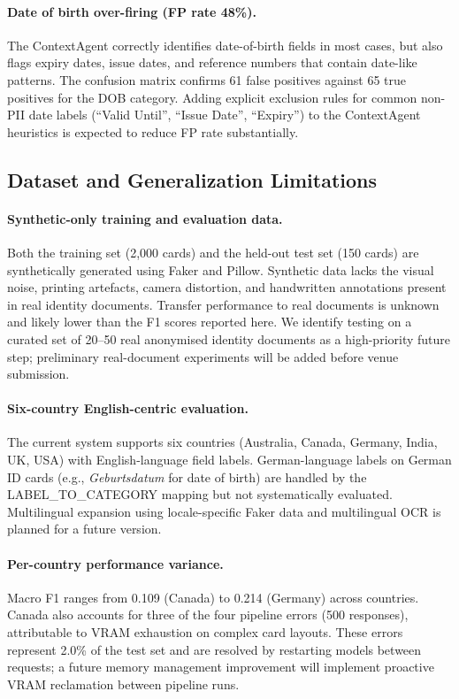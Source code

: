 \documentclass[conference]{IEEEtran}
\begin{document}
\paragraph{Date of birth over-firing (FP rate 48\%).}
The ContextAgent correctly identifies date-of-birth
fields in most cases, but also flags expiry dates,
issue dates, and reference numbers that contain
date-like patterns.
The confusion matrix confirms 61 false positives
against 65 true positives for the DOB category.
Adding explicit exclusion rules for common non-PII
date labels (``Valid Until'', ``Issue Date'',
``Expiry'') to the ContextAgent heuristics is
expected to reduce FP rate substantially.

\subsection{Dataset and Generalization Limitations}

\paragraph{Synthetic-only training and evaluation data.}
Both the training set (2,000 cards) and the held-out
test set (150 cards) are synthetically generated using
Faker and Pillow.
Synthetic data lacks the visual noise, printing
artefacts, camera distortion, and handwritten
annotations present in real identity documents.
Transfer performance to real documents is unknown and
likely lower than the F1 scores reported here.
We identify testing on a curated set of 20--50
real anonymised identity documents as a high-priority
future step; preliminary real-document experiments will
be added before venue submission.

\paragraph{Six-country English-centric evaluation.}
The current system supports six countries
(Australia, Canada, Germany, India, UK, USA) with
English-language field labels.
German-language labels on German ID cards (e.g.,
\textit{Geburtsdatum} for date of birth) are
handled by the LABEL\_TO\_CATEGORY mapping but
not systematically evaluated.
Multilingual expansion using locale-specific Faker
data and multilingual OCR is planned for a future
version.

\paragraph{Per-country performance variance.}
Macro F1 ranges from 0.109 (Canada) to 0.214
(Germany) across countries.
Canada also accounts for three of the four pipeline
errors (500 responses), attributable to VRAM exhaustion
on complex card layouts.
These errors represent 2.0\% of the test set and
are resolved by restarting models between requests;
a future memory management improvement will implement
proactive VRAM reclamation between pipeline runs.
\end{document}

